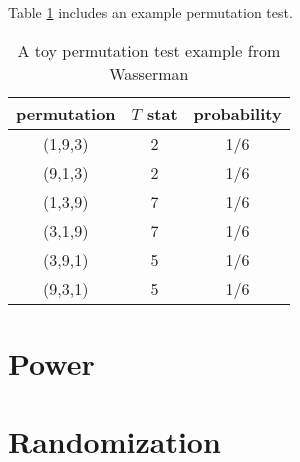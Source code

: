 \documentclass[]{article}
\theoremstyle{definition}
\begin{document}
Table \ref{t:permutation} includes an example permutation test.

\begin{table}[]
\centering
\begin{tabular}{c | c | c} 
permutation & $T$ stat & probability \\ \hline	
(1,9,3) & 2 & 1/6 \\ %
(9,1,3) & 2 &  1/6 \\ %
(1,3,9) & 7  & 1/6 \\ %
(3,1,9) &  7 &  1/6 \\ %
(3,9,1) & 5  &  1/6\\ %
(9,3,1) &  5 & 1/6 \\ %
\end{tabular}
\caption{A toy permutation test example from Wasserman}\label{t:permutation}
\end{table}




\section{Power}\label{s:power}

\section{Randomization}\label{s:randomization}
\end{document}

